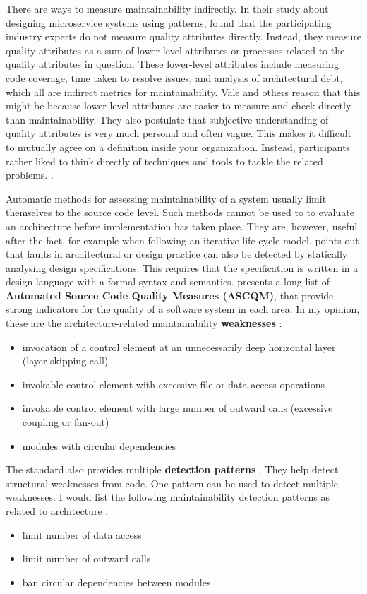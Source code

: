 \documentclass[utf8,english]{gradu3}
\begin{document}
There are ways to measure maintainability indirectly. In their study about
designing microservice systems using patterns, \textcite[9]{Vale2022} found that
the participating industry experts do not measure quality attributes directly.
Instead, they measure quality attributes as a sum of lower-level attributes or
processes related to the quality attributes in question. These lower-level
attributes include measuring code coverage, time taken to resolve issues, and
analysis of architectural debt, which all are indirect metrics for
maintainability. Vale and others reason that this might be because lower level
attributes are easier to measure and check directly than maintainability. They
also postulate that subjective understanding of quality attributes is very much
personal and often vague. This makes it difficult to mutually agree on a
definition inside your organization. Instead, participants rather liked to think
directly of techniques and tools to tackle the related problems.
\parencite[7-10]{Vale2022}.

Automatic methods for assessing maintainability of a system usually limit
themselves to the source code level. Such methods cannot be used to to evaluate
an architecture before implementation has taken place. They are, however, useful
after the fact, for example when following an iterative life cycle model.
\textcite[1]{ISO5055} points out that faults in architectural or design practice
can also be detected by statically analysing design specifications. This
requires that the specification is written in a design language with a formal
syntax and semantics. \textcite[2]{ISO5055} presents a long list of
\textbf{Automated Source Code Quality Measures (ASCQM)}, that provide strong
indicators for the quality of a software system in each area. In my opinion,
these are the architecture-related maintainability \textbf{weaknesses}
\parencite[38-47]{ISO5055}:
\begin{itemize}
  \item invocation of a control element at an unnecessarily deep horizontal
        layer (layer-skipping call)
  \item invokable control element with excessive file or data access operations
  \item invokable control element with large number of outward calls (excessive coupling
        or fan-out)
  \item modules with circular dependencies
\end{itemize}

The standard also provides multiple \textbf{detection patterns}
\parencite[2]{ISO5055}. They help detect structural weaknesses from code. One
pattern can be used to detect multiple weaknesses. I would list the following
maintainability detection patterns as related to architecture
\parencite[48-54]{ISO5055}:
\begin{itemize}
  \item limit number of data access
  \item limit number of outward calls
  \item ban circular dependencies between modules
\end{itemize}
\end{document}
